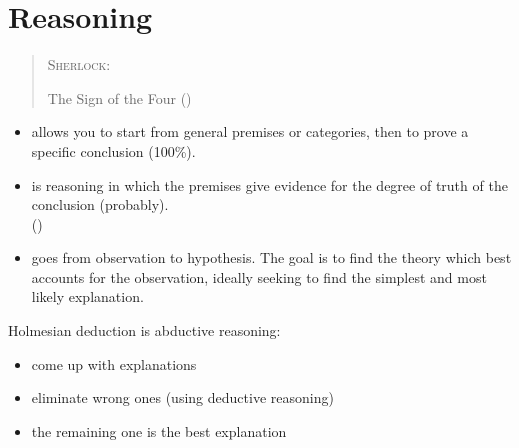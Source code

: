 \documentclass[a4paper,landscape,headrule,footrule,xetex]{foils}
\begin{document}
\section{Reasoning}
\begin{quote}  
\textsc{Sherlock:} 

\begin{flushright}
   The Sign of the Four () 
\end{flushright}
\end{quote}



\begin{itemize}
\item {} allows you to start from general
  premises or categories, then to prove a specific conclusion (100\%).
\item {} is reasoning in which the premises
  give evidence for the degree of truth of the conclusion (probably).
\\  ()
\item {} goes from observation to
  hypothesis.  The goal is to find the theory which best accounts for
  the observation, ideally seeking to find the simplest and most
  likely explanation.
\end{itemize}

Holmesian deduction is abductive reasoning:
\begin{itemize} \addtolength{\itemsep}{-1ex}
\item come up with explanations
\item eliminate wrong ones (using deductive reasoning)
\item the remaining one is the best explanation
\end{itemize}




\end{document}
